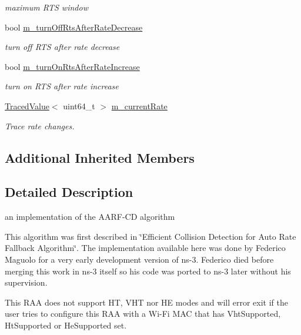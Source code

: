 \begin{DoxyCompactItemize}
\begin{DoxyCompactList}\small\item\em maximum R\+TS window \end{DoxyCompactList}\item 
bool \hyperlink{classns3_1_1AarfcdWifiManager_a5ebefecf767771e0d858de09fdb5c264}{m\+\_\+turn\+Off\+Rts\+After\+Rate\+Decrease}
\begin{DoxyCompactList}\small\item\em turn off R\+TS after rate decrease \end{DoxyCompactList}\item 
bool \hyperlink{classns3_1_1AarfcdWifiManager_a0938e5a61b20c3a78db3667d1e06f2fe}{m\+\_\+turn\+On\+Rts\+After\+Rate\+Increase}
\begin{DoxyCompactList}\small\item\em turn on R\+TS after rate increase \end{DoxyCompactList}\item 
\hyperlink{classns3_1_1TracedValue}{Traced\+Value}$<$ uint64\+\_\+t $>$ \hyperlink{classns3_1_1AarfcdWifiManager_a1f86797dfc4dace6a388385913cbd6f4}{m\+\_\+current\+Rate}
\begin{DoxyCompactList}\small\item\em Trace rate changes. \end{DoxyCompactList}\end{DoxyCompactItemize}
\subsection*{Additional Inherited Members}


\subsection{Detailed Description}
an implementation of the A\+A\+R\+F-\/\+CD algorithm

This algorithm was first described in \char`\"{}\+Efficient Collision Detection for Auto Rate Fallback Algorithm\char`\"{}. The implementation available here was done by Federico Maguolo for a very early development version of ns-\/3. Federico died before merging this work in ns-\/3 itself so his code was ported to ns-\/3 later without his supervision. 

This R\+AA does not support HT, V\+HT nor HE modes and will error exit if the user tries to configure this R\+AA with a Wi-\/\+Fi M\+AC that has Vht\+Supported, Ht\+Supported or He\+Supported set. 

